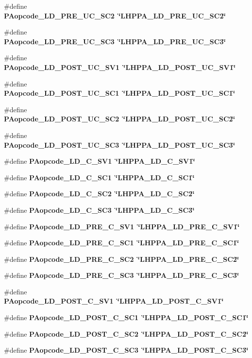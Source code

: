 \begin{CompactItemize}
\item 
\#define \bf{PAopcode\_\-LD\_\-PRE\_\-UC\_\-SC2}~\char`\"{}LHPPA\_\-LD\_\-PRE\_\-UC\_\-SC2\char`\"{}
\item 
\#define \bf{PAopcode\_\-LD\_\-PRE\_\-UC\_\-SC3}~\char`\"{}LHPPA\_\-LD\_\-PRE\_\-UC\_\-SC3\char`\"{}
\item 
\#define \bf{PAopcode\_\-LD\_\-POST\_\-UC\_\-SV1}~\char`\"{}LHPPA\_\-LD\_\-POST\_\-UC\_\-SV1\char`\"{}
\item 
\#define \bf{PAopcode\_\-LD\_\-POST\_\-UC\_\-SC1}~\char`\"{}LHPPA\_\-LD\_\-POST\_\-UC\_\-SC1\char`\"{}
\item 
\#define \bf{PAopcode\_\-LD\_\-POST\_\-UC\_\-SC2}~\char`\"{}LHPPA\_\-LD\_\-POST\_\-UC\_\-SC2\char`\"{}
\item 
\#define \bf{PAopcode\_\-LD\_\-POST\_\-UC\_\-SC3}~\char`\"{}LHPPA\_\-LD\_\-POST\_\-UC\_\-SC3\char`\"{}
\item 
\#define \bf{PAopcode\_\-LD\_\-C\_\-SV1}~\char`\"{}LHPPA\_\-LD\_\-C\_\-SV1\char`\"{}
\item 
\#define \bf{PAopcode\_\-LD\_\-C\_\-SC1}~\char`\"{}LHPPA\_\-LD\_\-C\_\-SC1\char`\"{}
\item 
\#define \bf{PAopcode\_\-LD\_\-C\_\-SC2}~\char`\"{}LHPPA\_\-LD\_\-C\_\-SC2\char`\"{}
\item 
\#define \bf{PAopcode\_\-LD\_\-C\_\-SC3}~\char`\"{}LHPPA\_\-LD\_\-C\_\-SC3\char`\"{}
\item 
\#define \bf{PAopcode\_\-LD\_\-PRE\_\-C\_\-SV1}~\char`\"{}LHPPA\_\-LD\_\-PRE\_\-C\_\-SV1\char`\"{}
\item 
\#define \bf{PAopcode\_\-LD\_\-PRE\_\-C\_\-SC1}~\char`\"{}LHPPA\_\-LD\_\-PRE\_\-C\_\-SC1\char`\"{}
\item 
\#define \bf{PAopcode\_\-LD\_\-PRE\_\-C\_\-SC2}~\char`\"{}LHPPA\_\-LD\_\-PRE\_\-C\_\-SC2\char`\"{}
\item 
\#define \bf{PAopcode\_\-LD\_\-PRE\_\-C\_\-SC3}~\char`\"{}LHPPA\_\-LD\_\-PRE\_\-C\_\-SC3\char`\"{}
\item 
\#define \bf{PAopcode\_\-LD\_\-POST\_\-C\_\-SV1}~\char`\"{}LHPPA\_\-LD\_\-POST\_\-C\_\-SV1\char`\"{}
\item 
\#define \bf{PAopcode\_\-LD\_\-POST\_\-C\_\-SC1}~\char`\"{}LHPPA\_\-LD\_\-POST\_\-C\_\-SC1\char`\"{}
\item 
\#define \bf{PAopcode\_\-LD\_\-POST\_\-C\_\-SC2}~\char`\"{}LHPPA\_\-LD\_\-POST\_\-C\_\-SC2\char`\"{}
\item 
\#define \bf{PAopcode\_\-LD\_\-POST\_\-C\_\-SC3}~\char`\"{}LHPPA\_\-LD\_\-POST\_\-C\_\-SC3\char`\"{}

\end{CompactItemize}
